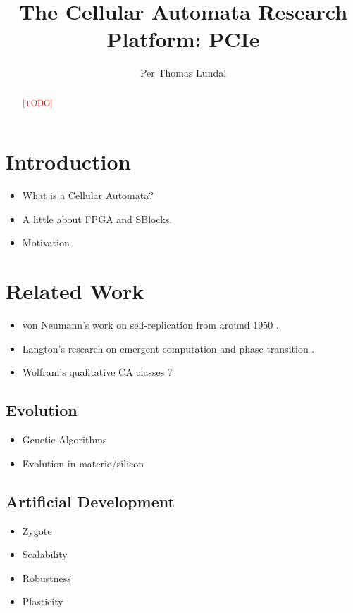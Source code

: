 \documentclass[a4paper]{IEEEtran}
\title{The Cellular Automata Research Platform: PCIe}
\author{Per Thomas Lundal}
\newcommand\TODO{\textcolor{red}{[TODO]}}
\begin{document}
\maketitle

\begin{abstract}

\TODO

\end{abstract}

\section{Introduction}

\begin{itemize}
    \item What is a Cellular Automata?
    \item A little about FPGA and SBlocks.
    \item Motivation
\end{itemize}

\section{Related Work}

\begin{itemize}
    \item von Neumann's work on self-replication from around 1950 \cite{neumann1966selfreplication}.
    \item Langton's research on emergent computation and phase transition \cite{langton1990edgeofchaos}.
    \item Wolfram's quafitative CA classes \cite{wolfram1984complexity}?
\end{itemize}

\subsection{Evolution}

\begin{itemize}
    \item Genetic Algorithms
    \item Evolution in materio/silicon \cite{miller2014evolution}
\end{itemize}

\subsection{Artificial Development \cite{harding2008artificial}}
\begin{itemize}
    \item Zygote
    \item Scalability
    \item Robustness
    \item Plasticity
\end{itemize}
\end{document}
